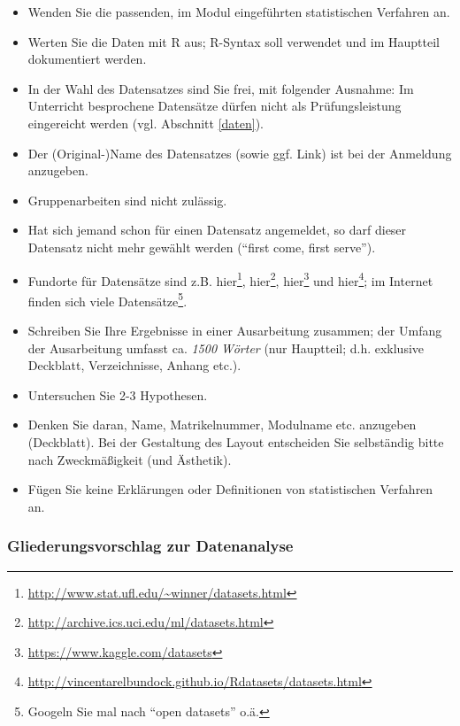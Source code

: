 \documentclass[12pt,ngerman,]{book}
\let\rmarkdownfootnote\footnote%
\def\footnote{\protect\rmarkdownfootnote}
\renewcommand{\href}[2]{#2\footnote{\url{#1}}}
\theoremstyle{definition}
\theoremstyle{definition}
\theoremstyle{remark}
\begin{document}
\begin{itemize}
\item
  Wenden Sie die passenden, im Modul eingeführten statistischen
  Verfahren an.
\item
  Werten Sie die Daten mit R aus; R-Syntax soll verwendet und im
  Hauptteil dokumentiert werden.
\item
  In der Wahl des Datensatzes sind Sie frei, mit folgender Ausnahme: Im
  Unterricht besprochene Datensätze dürfen nicht als Prüfungsleistung
  eingereicht werden (vgl. Abschnitt \ref{daten}).
\item
  Der (Original-)Name des Datensatzes (sowie ggf. Link) ist bei der
  Anmeldung anzugeben.
\item
  Gruppenarbeiten sind nicht zulässig.
\item
  Hat sich jemand schon für einen Datensatz angemeldet, so darf dieser
  Datensatz nicht mehr gewählt werden (``first come, first serve'').
\item
  Fundorte für Datensätze sind z.B.
  \href{http://www.stat.ufl.edu/~winner/datasets.html}{hier},
  \href{http://archive.ics.uci.edu/ml/datasets.html}{hier},
  \href{https://www.kaggle.com/datasets}{hier} und
  \href{http://vincentarelbundock.github.io/Rdatasets/datasets.html}{hier};
  im Internet finden sich viele Datensätze\footnote{Googeln Sie mal nach
    ``open datasets'' o.ä.}.
\item
  Schreiben Sie Ihre Ergebnisse in einer Ausarbeitung zusammen; der
  Umfang der Ausarbeitung umfasst ca. \emph{1500 Wörter} (nur Hauptteil;
  d.h. exklusive Deckblatt, Verzeichnisse, Anhang etc.).
\item
  Untersuchen Sie 2-3 Hypothesen.
\item
  Denken Sie daran, Name, Matrikelnummer, Modulname etc. anzugeben
  (Deckblatt). Bei der Gestaltung des Layout entscheiden Sie selbständig
  bitte nach Zweckmäßigkeit (und Ästhetik).
\item
  Fügen Sie keine Erklärungen oder Definitionen von statistischen
  Verfahren an.
\end{itemize}

\subsubsection{Gliederungsvorschlag zur
Datenanalyse}\label{gliederungsvorschlag-zur-datenanalyse}
\end{document}
